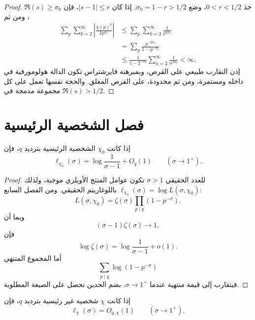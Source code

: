\begin{proof}
خذ \(0<r<1/2\)، وضع \(\sigma_0=1-r>1/2\). إذا كان
\(|s-1|\leq r\)، فإن \(\Re(s)\geq\sigma_0\)، ومن ثم
\begin{align*}
\sum_p\sum_{k=2}^{\infty}
\left|\frac{\chi(p)^k}{k p^{ks}}\right|
&\leq
\sum_p\sum_{k=2}^{\infty}\frac1{p^{k\sigma_0}}\\
&=
\sum_p\frac{p^{-2\sigma_0}}{1-p^{-\sigma_0}}\\
&\leq
\frac1{1-2^{-\sigma_0}}
\sum_{n=2}^{\infty}\frac1{n^{2\sigma_0}}<\infty.
\end{align*}
إذن التقارب طبيعي على القرص، وبمبرهنة فايرشتراس تكون الدالة هولومورفية
في داخله ومستمرة، ومن ثم محدودة، على القرص المغلق. والحجة نفسها تعمل على
كل مجموعة مدمجة في \(\Re(s)>1/2\).
\end{proof}

\section{فصل الشخصية الرئيسية}

\begin{proposition}
\label{prop:principal-character-log-growth}
\provedhere
إذا كانت \(\chi_0\) الشخصية الرئيسية بترديد \(q\)، فإن
\[
\ell_{\chi_0}(\sigma)
=
\log\frac1{\sigma-1}+O_q(1)
\qquad(\sigma\to1^+).
\]
\end{proposition}

\begin{proof}
للعدد الحقيقي \(\sigma>1\) تكون عوامل المنتج الأويلري موجبة، ولذلك
\(\ell_{\chi_0}(\sigma)=\log L(\sigma,\chi_0)\) باللوغاريتم الحقيقي.
ومن الفصل السابع:
\[
L(\sigma,\chi_0)
=
\zeta(\sigma)\prod_{p\mid q}(1-p^{-\sigma}).
\]
وبما أن
\[
(\sigma-1)\zeta(\sigma)\longrightarrow1,
\]
فإن
\[
\log\zeta(\sigma)
=
\log\frac1{\sigma-1}+o(1).
\]
أما المجموع المنتهي
\[
\sum_{p\mid q}\log(1-p^{-\sigma})
\]
فيتقارب إلى قيمة منتهية عندما \(\sigma\to1^+\). بضم الحدين نحصل على
الصيغة المطلوبة.
\end{proof}

\begin{proposition}
\label{prop:nonprincipal-character-log-bounded}
\provedhere
إذا كانت \(\chi\) شخصية غير رئيسية بترديد \(q\)، فإن
\[
\ell_\chi(\sigma)=O_{q,\chi}(1)
\qquad(\sigma\to1^+).
\]
\end{proposition}

